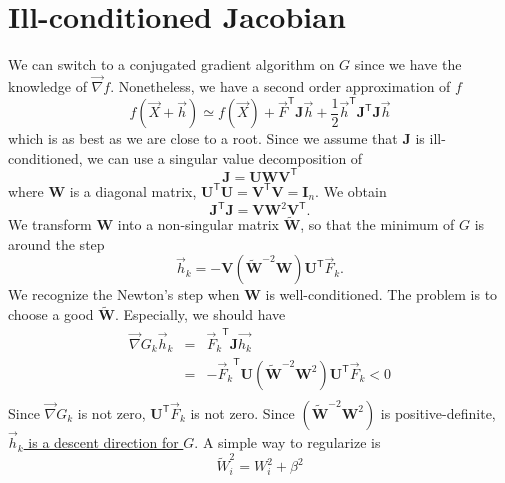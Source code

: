 \documentclass[aps,twocolumn]{revtex4}
\newcommand{\mymat}[1]{\boldsymbol{#1}}
\newcommand{\mytrn}[1]{{#1}^{\mathsf{T}}}
\newcommand{\mygrad}{\vec{\nabla}}
\begin{document}
\section{Ill-conditioned Jacobian}
We can switch to a conjugated gradient algorithm on $G$ since we have the knowledge of $\mygrad f$.
Nonetheless, we have a second order approximation of $f$
\begin{equation}
	f\left(\vec{X}+\vec{h}\right) \simeq f(\vec{X}) + \mytrn{\vec{F}} \mymat{J} \vec{h} +
	\frac{1}{2} \mytrn{\vec{h}} \mytrn{\mymat{J}}\mymat{J} \vec{h}
\end{equation}
which is as best as we are close to a root.
Since we assume that $\mymat{J}$ is ill-conditioned, we can use a singular value decomposition
of
\begin{equation}
	\mymat{J} = \mymat{U} \mymat{W} \mytrn{\mymat{V}}
\end{equation}
where $\mymat{W}$ is a diagonal matrix, $\mytrn{\mymat{U}}\mymat{U}=\mytrn{\mymat{V}}\mymat{V}=\mymat{I}_n$.
We obtain
\begin{equation}
	\mytrn{\mymat{J}}\mymat{J} = \mymat{V} \mymat{W}^2 \mytrn{\mymat{V}}.
\end{equation}
We transform $\mymat{W}$ into a non-singular matrix $\widetilde{\mymat{W}}$,
so that the minimum of $G$ is around the step
\begin{equation}
	\vec{h}_k = - \mymat{V} \left( \widetilde{\mymat{W}}^{-2} \mymat{W}\right) \mytrn{\mymat{U}} \vec{F}_k.
\end{equation}
We recognize the Newton's step when $\mymat{W}$ is well-conditioned.
The problem is to choose a good $\widetilde{\mymat{W}}$.
Especially, we should have
\begin{equation}
\begin{array}{rcl}
	\mygrad G_k \vec{h}_k & = &\mytrn{\vec{F}_k} \mymat{J} \vec{h_k} \\
	& = & - \mytrn{\vec{F}_k} \mymat{U} \left( \widetilde{\mymat{W}}^{-2} \mymat{W}^2 \right)\mytrn{\mymat{U}} \vec{F}_k < 0\\
\end{array}
\end{equation}
Since $\mygrad G_k$ is not zero, $\mytrn{\mymat{U}} \vec{F}_k$ is not zero.
Since $\left( \widetilde{\mymat{W}}^{-2} \mymat{W}^2 \right)$ is positive-definite,
\underline{$\vec{h}_k$ is a descent direction for $G$}.
A simple way to regularize is
\begin{equation}
	\widetilde{W}_i^2 = W_i^2 + \beta^2 
\end{equation}
\end{document}
